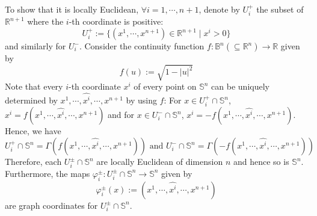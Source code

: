\begin{itemize}
    To show that it is locally Euclidean, $\forall i=1,\cdots, n+1$, denote by $U_i^+$ the subset of $\mathbb{R}^{n+1}$ where the $i$-th coordinate is positive:
    \[
    U_i^+:= \{(x^1 ,\cdots, x^{n+1}) \in \mathbb{R}^{n+1} \mid x^i>0\}
    \]
    and similarly for $U_i^-$. Consider the continuity function $f:\mathbb{B}^n (\subseteq \mathbb{R}^n) \to \mathbb{R}$ given by
    \[
    f(u):= \sqrt{1- |u|^2}
    \]
    Note that every $i$-th coordinate $x^i$ of every point on $\mathbb{S}^n$ can be uniquely determined by $x^1, \cdots, \widehat{x^i}, \cdots, x^{n+1}$ by using $f$: For $x\in U_i^+ \cap \mathbb{S}^n$, $x^i= f(x^1 ,\cdots, \widehat{x^i} ,\cdots, x^{n+1})$ and for $x \in U_i^- \cap \mathbb{S}^n$, $x^i=- f(x^1 ,\cdots, \widehat{x^i} ,\cdots, x^{n+1})$. Hence, we have
    \[
    U_i^+ \cap \mathbb{S}^n= \Gamma(f(x^1 ,\cdots, \widehat{x^i} ,\cdots, x^{n+1})) \text{ and } U_i^- \cap \mathbb{S}^n= \Gamma(-f(x^1 ,\cdots, \widehat{x^i} ,\cdots, x^{n+1}))
    \]
    Therefore, each $U_i^{\pm} \cap \mathbb{S}^n$ are locally Euclidean of dimension $n$ and hence so is $\mathbb{S}^n$. Furthermore, the maps $\varphi_i^{\pm}: U_i^{\pm} \cap \mathbb{S}^n \to \mathbb{S}^n$ given by
    \[
    \varphi_i^{\pm} (x):= (x^1,\cdots, \widehat{x^i}, \cdots, x^{n+1})
    \]
    are graph coordinates for $U_i^{\pm} \cap \mathbb{S}^n$.


\end{itemize}
